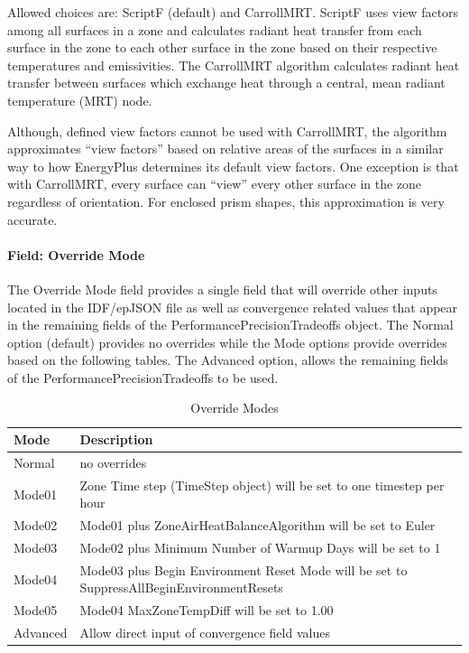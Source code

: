 Allowed choices are: ScriptF (default) and CarrollMRT. ScriptF uses view factors among all surfaces in a zone and calculates radiant heat transfer from each surface in the zone to each other surface in the zone based on their respective temperatures and emissivities. The CarrollMRT algorithm calculates radiant heat transfer between surfaces which exchange heat through a central, mean radiant temperature (MRT) node.

Although, defined view factors cannot be used with CarrollMRT, the algorithm approximates ``view factors'' based on relative areas of the surfaces in a similar way to how EnergyPlus determines its default view factors. One exception is that with CarrollMRT, every surface can ``view'' every other surface in the zone regardless of orientation. For enclosed prism shapes, this approximation is very accurate.

\paragraph{Field: Override Mode}\label{override-mode}

The Override Mode field provides a single field that will override other inputs located in the IDF/epJSON file as well as convergence related values that appear in the remaining fields of the PerformancePrecisionTradeoffs object. The Normal option (default) provides no overrides while the Mode options provide overrides based on the following tables. The Advanced option, allows the remaining fields of the PerformancePrecisionTradeoffs to be used. 

\begin{longtable}[c]{p{1.5in}p{5.0in}}
\caption{Override Modes\label{table:override_modes}} \tabularnewline
\toprule
Mode & Description \tabularnewline
\midrule
\endfirsthead

Normal & no overrides\tabularnewline
Mode01 & Zone Time step (TimeStep object) will be set to one timestep per hour\tabularnewline
Mode02 & Mode01 plus ZoneAirHeatBalanceAlgorithm will be set to Euler\tabularnewline
Mode03 & Mode02 plus Minimum Number of Warmup Days will be set to 1\tabularnewline
Mode04 & Mode03 plus Begin Environment Reset Mode will be set to SuppressAllBeginEnvironmentResets\tabularnewline
Mode05 & Mode04 MaxZoneTempDiff will be set to 1.00\tabularnewline
Advanced& Allow direct input of convergence field values\tabularnewline

\bottomrule
\end{longtable}

